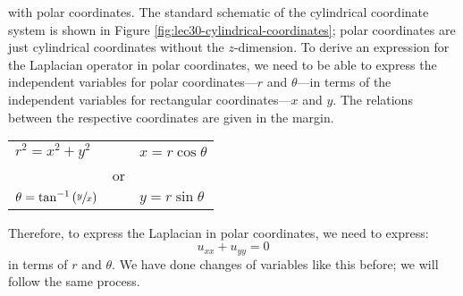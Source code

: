  with polar coordinates.  The standard schematic of the cylindrical coordinate system is shown in Figure \ref{fig:lec30-cylindrical-coordinates}; polar coordinates are just cylindrical coordinates without the $z$-dimension.  To derive an expression for the Laplacian operator in polar coordinates, we need to be able to express the independent variables for polar coordinates---$r$ and $\theta$---in terms of the independent variables for rectangular coordinates---$x$ and $y$.  The relations between the respective coordinates are given in the margin.
\begin{margintable}
\begin{tabular}{l l l}
$r^2 = x^2 + y^2$ & & $x = r \cos{\theta} $ \\
 & \multicolumn{1}{c}{or} & \\
 $\theta = \tan^{-1}{(\sfrac{y}{x})}$ & & $y = r \sin{\theta}$\\
 \end{tabular}
\end{margintable}
Therefore, to express the Laplacian in polar coordinates, we need to express:
\begin{equation*}
u_{xx} + u_{yy} = 0
\end{equation*}
in terms of $r$ and $\theta$.  We have done changes of variables like this before; we will follow the same process.

